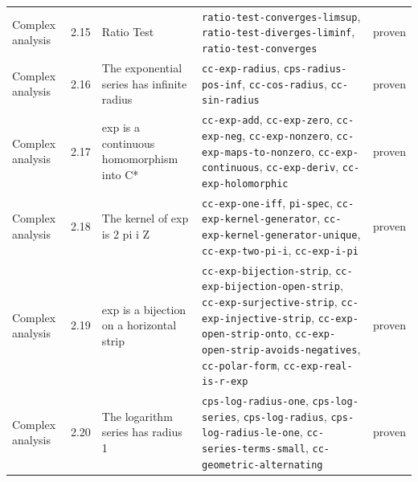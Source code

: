 \begin{longtable}{@{}ll>{\raggedright\arraybackslash}p{4.2cm}>{\raggedright\arraybackslash}p{4.2cm}l@{}}
Complex analysis & 2.15 & Ratio Test & \texttt{ratio-\allowbreak{}test-\allowbreak{}converges-\allowbreak{}limsup}, \texttt{ratio-\allowbreak{}test-\allowbreak{}diverges-\allowbreak{}liminf}, \texttt{ratio-\allowbreak{}test-\allowbreak{}converges} & proven \\
Complex analysis & 2.16 & The exponential series has infinite radius & \texttt{cc-\allowbreak{}exp-\allowbreak{}radius}, \texttt{cps-\allowbreak{}radius-\allowbreak{}pos-\allowbreak{}inf}, \texttt{cc-\allowbreak{}cos-\allowbreak{}radius}, \texttt{cc-\allowbreak{}sin-\allowbreak{}radius} & proven \\
Complex analysis & 2.17 & exp is a continuous homomorphism into C* & \texttt{cc-\allowbreak{}exp-\allowbreak{}add}, \texttt{cc-\allowbreak{}exp-\allowbreak{}zero}, \texttt{cc-\allowbreak{}exp-\allowbreak{}neg}, \texttt{cc-\allowbreak{}exp-\allowbreak{}nonzero}, \texttt{cc-\allowbreak{}exp-\allowbreak{}maps-\allowbreak{}to-\allowbreak{}nonzero}, \texttt{cc-\allowbreak{}exp-\allowbreak{}continuous}, \texttt{cc-\allowbreak{}exp-\allowbreak{}deriv}, \texttt{cc-\allowbreak{}exp-\allowbreak{}holomorphic} & proven \\
Complex analysis & 2.18 & The kernel of exp is 2 pi i Z & \texttt{cc-\allowbreak{}exp-\allowbreak{}one-\allowbreak{}iff}, \texttt{pi-\allowbreak{}spec}, \texttt{cc-\allowbreak{}exp-\allowbreak{}kernel-\allowbreak{}generator}, \texttt{cc-\allowbreak{}exp-\allowbreak{}kernel-\allowbreak{}generator-\allowbreak{}unique}, \texttt{cc-\allowbreak{}exp-\allowbreak{}two-\allowbreak{}pi-\allowbreak{}i}, \texttt{cc-\allowbreak{}exp-\allowbreak{}i-\allowbreak{}pi} & proven \\
Complex analysis & 2.19 & exp is a bijection on a horizontal strip & \texttt{cc-\allowbreak{}exp-\allowbreak{}bijection-\allowbreak{}strip}, \texttt{cc-\allowbreak{}exp-\allowbreak{}bijection-\allowbreak{}open-\allowbreak{}strip}, \texttt{cc-\allowbreak{}exp-\allowbreak{}surjective-\allowbreak{}strip}, \texttt{cc-\allowbreak{}exp-\allowbreak{}injective-\allowbreak{}strip}, \texttt{cc-\allowbreak{}exp-\allowbreak{}open-\allowbreak{}strip-\allowbreak{}onto}, \texttt{cc-\allowbreak{}exp-\allowbreak{}open-\allowbreak{}strip-\allowbreak{}avoids-\allowbreak{}negatives}, \texttt{cc-\allowbreak{}polar-\allowbreak{}form}, \texttt{cc-\allowbreak{}exp-\allowbreak{}real-\allowbreak{}is-\allowbreak{}r-\allowbreak{}exp} & proven \\
Complex analysis & 2.20 & The logarithm series has radius 1 & \texttt{cps-\allowbreak{}log-\allowbreak{}radius-\allowbreak{}one}, \texttt{cps-\allowbreak{}log-\allowbreak{}series}, \texttt{cps-\allowbreak{}log-\allowbreak{}radius}, \texttt{cps-\allowbreak{}log-\allowbreak{}radius-\allowbreak{}le-\allowbreak{}one}, \texttt{cc-\allowbreak{}series-\allowbreak{}terms-\allowbreak{}small}, \texttt{cc-\allowbreak{}geometric-\allowbreak{}alternating} & proven \\

\end{longtable}
